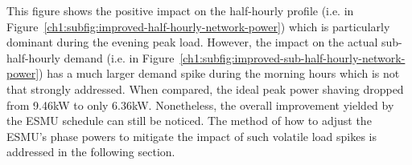 

This figure shows the positive impact on the half-hourly profile (i.e. in Figure~\ref{ch1:subfig:improved-half-hourly-network-power}) which is particularly dominant during the evening peak load.
However, the impact on the actual sub-half-hourly demand (i.e. in Figure~\ref{ch1:subfig:improved-sub-half-hourly-network-power}) has a much larger demand spike during the morning hours which is not that strongly addressed.
When compared, the ideal peak power shaving dropped from 9.46kW to only 6.36kW.
Nonetheless, the overall improvement yielded by the ESMU schedule can still be noticed. 
The method of how to adjust the ESMU's phase powers to mitigate the impact of such volatile load spikes is addressed in the following section.

